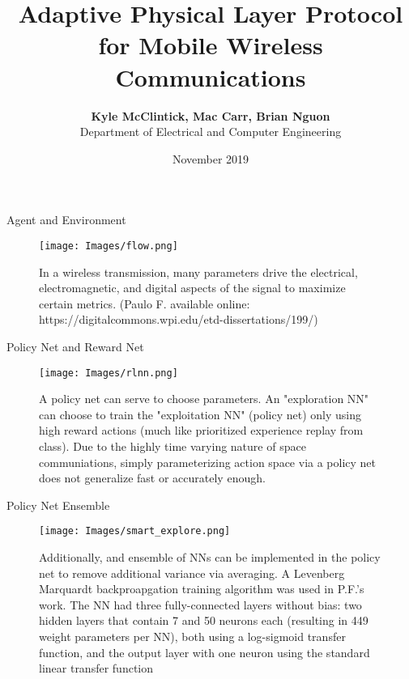 \documentclass[pdf]{beamer}
\title{Adaptive Physical Layer Protocol for Mobile Wireless Communications}
\date{November 2019}
\author{\textbf{Kyle McClintick, Mac Carr, Brian Nguon} \\ Department of Electrical and Computer Engineering}
\institute{ \hfill\texttt{[image: wilab\_logo-A70916.eps]}\hspace*{1.7cm}\texttt{[image: WPI\_Inst\_Prim\_FulClr.eps]}}
\begin{document}
\captionsetup[subfigure]{labelformat=empty}

\maketitle




\begin{frame}[fragile]{Agent and Environment}
\begin{figure}
\centering
\texttt{[image: Images/flow.png]}
\caption{In a wireless transmission, many parameters drive the electrical, electromagnetic, and digital aspects of the signal to maximize certain metrics. (Paulo F. available online: https://digitalcommons.wpi.edu/etd-dissertations/199/)}
\end{figure}
\end{frame}

\begin{frame}[fragile]{Policy Net and Reward Net}
\begin{figure}
\centering
\texttt{[image: Images/rlnn.png]}
\caption{A policy net can serve to choose parameters. An "exploration NN" can choose to train the "exploitation NN" (policy net) only using high reward actions (much like prioritized experience replay from class). Due to the highly time varying nature of space communiations, simply parameterizing action space via a policy net does not generalize fast or accurately enough.}
\end{figure}
\end{frame}

\begin{frame}[fragile]{Policy Net Ensemble}
\begin{figure}
\centering
\texttt{[image: Images/smart\_explore.png]}
\caption{Additionally, and ensemble of NNs can be implemented in the policy net to remove additional variance via averaging. A Levenberg Marquardt backproapgation training algorithm was used in P.F.'s work. The NN had three fully-connected layers without bias: two hidden layers that contain 7 and 50 neurons each (resulting in
449 weight parameters per NN), both using a log-sigmoid transfer function, and the output layer with one neuron using the standard linear transfer function}
\end{figure}
\end{frame}
\end{document}
